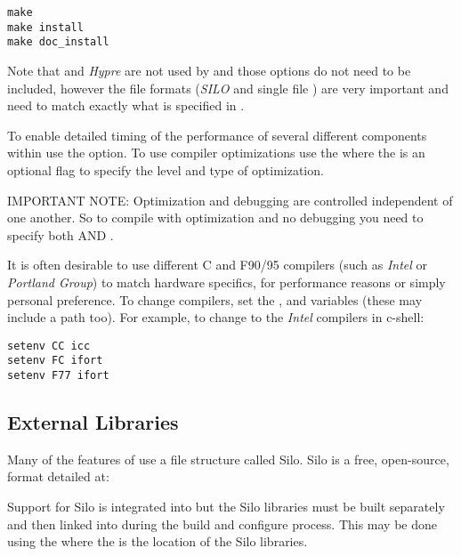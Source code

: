 \begin{enumerate}
\begin{display}
\begin{verbatim}
make 
make install
make doc_install
\end{verbatim}\end{display}

Note that  and \emph{Hypre} are not used by  and
those options do not need to be included, however the file formats (\emph{SILO} 
and single file ) are very important and need to match exactly what is
specified in .

To enable detailed timing of the performance of several different
components within \parflow{} use the  option.
To use compiler optimizations use the  where
the  is an optional flag to specify the level and type
of optimization.

IMPORTANT NOTE: Optimization and debugging are controlled independent of one
another.  So to compile with optimization and no debugging you need to
specify both  AND .

It is often desirable to use different C and F90/95 compilers 
(such as \emph{Intel} or \emph{Portland Group}) to match hardware specifics,
for performance reasons or simply personal preference.  To change compilers,
set the ,  and  variables (these may include a path too). 
For example, to change to the \emph{Intel} compilers in c-shell:
\begin{display}\begin{verbatim}
setenv CC icc
setenv FC ifort
setenv F77 ifort
\end{verbatim}\end{display}
\end{enumerate}

\subsection{External Libraries}
\label{External Libraries}
Many of the features of \parflow{} use a file structure called Silo.  
Silo is a free, open-source, format detailed at:
\begin{center}
\end{center}
Support for Silo is integrated into \parflow{} but the Silo libraries 
must be built separately and then linked into \parflow{} during the 
build and configure process.   This may be done using the  
where the  is the location of the Silo libraries.

